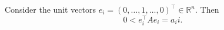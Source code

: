 Consider the unit vectors $e_i = (0,\ldots, 1, \ldots, 0)^\top \in \mathbb{R}^n$. Then
$$0 < e_i^\top A e_i = a_ii. $$

